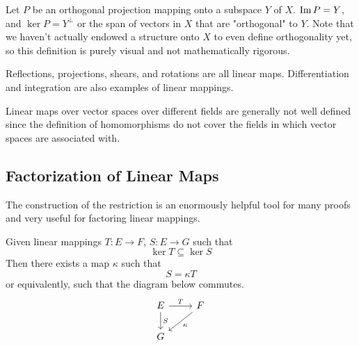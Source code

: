   \begin{example}
    Let $P$ be an orthogonal projection mapping onto a subspace $Y$ of $X$. $\operatorname{Im} P = Y$, and $\ker P = Y^\perp$ or the span of vectors in $X$ that are "orthogonal" to $Y$. Note that we haven't actually endowed a structure onto $X$ to even define orthogonality yet, so this definition is purely visual and not mathematically rigorous. 
  \end{example}

  \begin{example}
    Reflections, projections, shears, and rotations are all linear maps. Differentiation and integration are also examples of linear mappings. 
  \end{example}

  Linear maps over vector spaces over different fields are generally not well defined since the definition of homomorphisms do not cover the fields in which vector spaces are associated with. 

\subsection{Factorization of Linear Maps}

  The construction of the restriction is an enormously helpful tool for many proofs and very useful for factoring linear mappings. 

  \begin{theorem}
    Given linear mappings $T: E \longrightarrow F$, $S: E \longrightarrow G$ such that
    \begin{equation}
      \ker{T} \subseteq \ker{S}
    \end{equation}
    Then there exists a map $\kappa$ such that 
    \begin{equation}
      S = \kappa T
    \end{equation}
    or equivalently, such that the diagram below commutes. 
    \[\begin{tikzcd} 
        E \arrow{r}{T} \arrow{d}{S} & F \arrow{dl}{\kappa} \\
        G 
    \end{tikzcd}\]
  \end{theorem}

